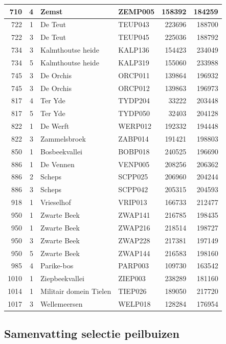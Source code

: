 \documentclass[11pt,]{book}
\begin{document}
\begin{table}
\begin{tabular}[t]{r|r|l|l|r|r}
\hline
710 & 4 & Zemst & ZEMP005 & 158392 & 184259\\
\hline
722 & 1 & De Teut & TEUP043 & 223696 & 188700\\
\hline
722 & 3 & De Teut & TEUP045 & 225036 & 188792\\
\hline
734 & 3 & Kalmthoutse heide & KALP136 & 154423 & 234049\\
\hline
734 & 5 & Kalmthoutse heide & KALP319 & 155060 & 233988\\
\hline
745 & 3 & De Orchis & ORCP011 & 139864 & 196932\\
\hline
745 & 3 & De Orchis & ORCP012 & 139863 & 196973\\
\hline
817 & 4 & Ter Yde & TYDP204 & 33222 & 203448\\
\hline
817 & 5 & Ter Yde & TYDP050 & 32403 & 204128\\
\hline
822 & 1 & De Werft & WERP012 & 192332 & 194448\\
\hline
822 & 3 & Zammelsbroek & ZABP014 & 191421 & 198803\\
\hline
850 & 1 & Bosbeekvallei & BOBP018 & 240525 & 196690\\
\hline
886 & 1 & De Vennen & VENP005 & 208256 & 206362\\
\hline
886 & 2 & Scheps & SCPP025 & 206960 & 204244\\
\hline
886 & 3 & Scheps & SCPP042 & 205315 & 204593\\
\hline
918 & 1 & Vrieselhof & VRIP013 & 166733 & 212477\\
\hline
950 & 1 & Zwarte Beek & ZWAP141 & 216785 & 198435\\
\hline
950 & 1 & Zwarte Beek & ZWAP216 & 218514 & 198727\\
\hline
950 & 3 & Zwarte Beek & ZWAP228 & 217381 & 197149\\
\hline
950 & 5 & Zwarte Beek & ZWAP144 & 216583 & 198160\\
\hline
985 & 4 & Parike-bos & PARP003 & 109730 & 163542\\
\hline
1010 & 1 & Ziepbeekvallei & ZIEP003 & 238289 & 181160\\
\hline
1014 & 1 & Militair domein Tielen & TIEP026 & 189050 & 217720\\
\hline
1017 & 3 & Wellemeersen & WELP018 & 128284 & 176954\\
\hline
\end{tabular}
\end{table}

\subsection{Samenvatting selectie
peilbuizen}\label{samenvatting-selectie-peilbuizen}
\end{document}
